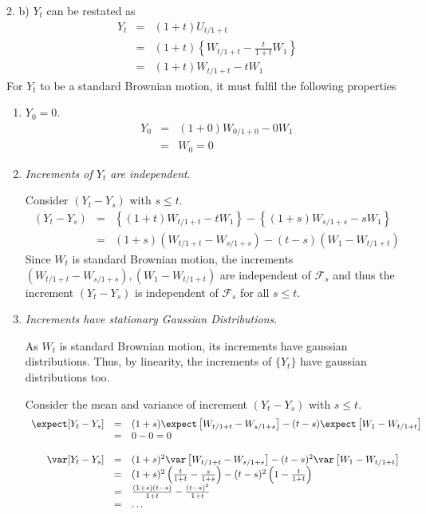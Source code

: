 \documentclass[11pt,a4paper]{article}
\begin{document}
\begin{answer}{2. b)}
  $Y_t$ can be restated as
  \[\begin{array}{rcl}
    Y_t&=&(1+t)U_{t/1+t}\\
    &=&(1+t)\left\{W_{t/1+t}-\frac{t}{1+t}W_1\right\}\\
    &=&(1+t)W_{t/1+t}-tW_1
  \end{array}\]
  For $Y_t$ to be a standard Brownian motion, it must fulfil the following properties
  \begin{enumerate}
    \item \textit{$Y_0=0$}.
    \[\begin{array}{rcl}
      Y_0&=&(1+0)W_{0/1+0}-0W_1\\
      &=&W_0=0
    \end{array}\]
    \item \textit{Increments of $Y_t$ are independent}.
    \par Consider $(Y_t-Y_s)$ with $s\leq t$.
    \[\begin{array}{rcl}
      (Y_t-Y_s)&=&\left\{(1+t)W_{t/1+t}-tW_1\right\}-\left\{(1+s)W_{s/1+s}-sW_1\right\}\\
      &=&(1+s)\left(W_{t/1+t}-W_{s/1+s}\right)-(t-s)\left(W_1-W_{t/1+t}\right)
    \end{array}\]
    Since $W_t$ is standard Brownian motion, the increments $\left(W_{t/1+t}-W_{s/1+s}\right),\left(W_1-W_{t/1+t}\right)$ are independent of $\mathcal{F}_s$ and thus the increment $(Y_t-Y_s)$ is independent of $\mathcal{F}_s$ for all $s\leq t$.
    \item \textit{Increments have stationary Gaussian Distributions}.
    \par As $W_t$ is standard Brownian motion, its increments have gaussian distributions. Thus, by linearity, the increments of $\{Y_t\}$ have gaussian distributions too.
    \par Consider the mean and variance of increment $(Y_t-Y_s)$ with $s\leq t$.
    \[\begin{array}{rcl}
      \expect[Y_t-Y_s]&=&(1+s)\expect\left[W_{t/1+t}-W_{s/1+s}\right]-(t-s)\expect\left[W_1-W_{t/1+t}\right]\\
      &=&0-0=0\\
      \\
      \var[Y_t-Y_s]&=&(1+s)^2\var\left[W_{t/1+t}-W_{s/1+s}\right]-(t-s)^2\var\left[W_1-W_{t/1+t}\right]\\
      &=&(1+s)^2\left(\frac{t}{1+t}-\frac{s}{1+s}\right)-(t-s)^2\left(1-\frac{t}{1+t}\right)\\
      &=&\frac{(1+s)(t-s)}{1+t}-\frac{(t-s)^2}{1+t}\\
      &=&\dots
    \end{array}\]
  \end{enumerate}
\end{answer}
\end{document}
